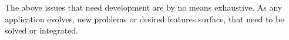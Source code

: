 \par The above issues that need development are by no means exhaustive. As any application evolves, new problems or desired features surface, that need to be solved or integrated. 



